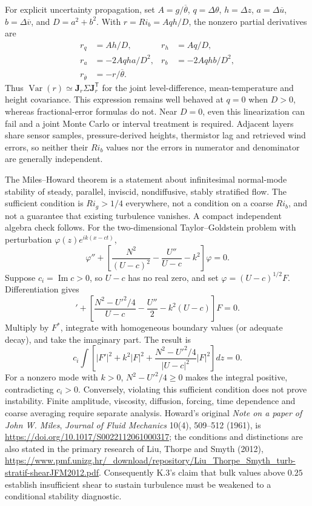 \documentclass[11pt,a4paper]{article}
\numberwithin{equation}{section}
\begin{document}
For explicit uncertainty propagation, set $A=g/\overline\theta$,
$q=\Delta\theta$, $h=\Delta z$, $a=\Delta\overline u$,
$b=\Delta\overline v$, and $D=a^2+b^2$. With $r=Ri_b=Aqh/D$, the
nonzero partial derivatives are
\begin{align}
 r_q&=Ah/D,& r_h&=Aq/D,\\
 r_a&=-2Aqha/D^2,&r_b&=-2Aqhb/D^2,\\
 r_{\overline\theta}&=-r/\overline\theta.
\end{align}
Thus $\operatorname{Var}(r)\simeq\boldsymbol J_r\Sigma
\boldsymbol J_r^{\mathsf T}$ for the joint level-difference, mean-temperature
and height covariance. This expression remains well behaved at $q=0$
when $D>0$, whereas fractional-error formulas do not. Near $D=0$, even
this linearization can fail and a joint Monte Carlo or interval treatment
is required. Adjacent layers share sensor samples, pressure-derived
heights, thermistor lag and retrieved wind errors, so neither their
$Ri_b$ values nor the errors in numerator and denominator are generally
independent.

The Miles--Howard theorem is a statement about infinitesimal normal-mode
stability of steady, parallel, inviscid, nondiffusive, stably stratified
flow. The sufficient condition is $Ri_g>1/4$ everywhere, not a condition
on a coarse $Ri_b$, and not a guarantee that existing turbulence vanishes.
A compact independent algebra check follows. For the two-dimensional
Taylor--Goldstein problem with perturbation $\varphi(z)e^{ik(x-ct)}$,
\begin{equation}
 \varphi''+\left[\frac{N^2}{(U-c)^2}
 -\frac{U''}{U-c}-k^2\right]\varphi=0.
\end{equation}
Suppose $c_i=\operatorname{Im}c>0$, so $U-c$ has no real zero, and set
$\varphi=(U-c)^{1/2}F$. Differentiation gives
\begin{equation}
 [(U-c)F']'+\left[\frac{N^2-U'^2/4}{U-c}
              -\frac{U''}{2}-k^2(U-c)\right]F=0.
\end{equation}
Multiply by $F^*$, integrate with homogeneous boundary values (or
adequate decay), and take the imaginary part. The result is
\begin{equation}
 c_i\int\left[|F'|^2+k^2|F|^2+
       \frac{N^2-U'^2/4}{|U-c|^2}|F|^2\right]dz=0.
\end{equation}
For a nonzero mode with $k>0$, $N^2-U'^2/4\geq0$ makes the integral
positive, contradicting $c_i>0$. Conversely, violating this sufficient
condition does not prove instability. Finite amplitude, viscosity,
diffusion, forcing, time dependence and coarse averaging require separate
analysis. Howard's original \emph{Note on a paper of John W. Miles},
\emph{Journal of Fluid Mechanics} 10(4), 509--512 (1961), is
\url{https://doi.org/10.1017/S0022112061000317}; the conditions and distinctions
are also stated in the primary research of Liu, Thorpe and Smyth (2012),
\url{https://www.pmf.unizg.hr/_download/repository/Liu_Thorpe_Smyth_turb-stratif-shearJFM2012.pdf}.
Consequently K.3's claim that bulk values above $0.25$ establish insufficient
shear to sustain turbulence must be weakened to a conditional stability
diagnostic.
\end{document}
